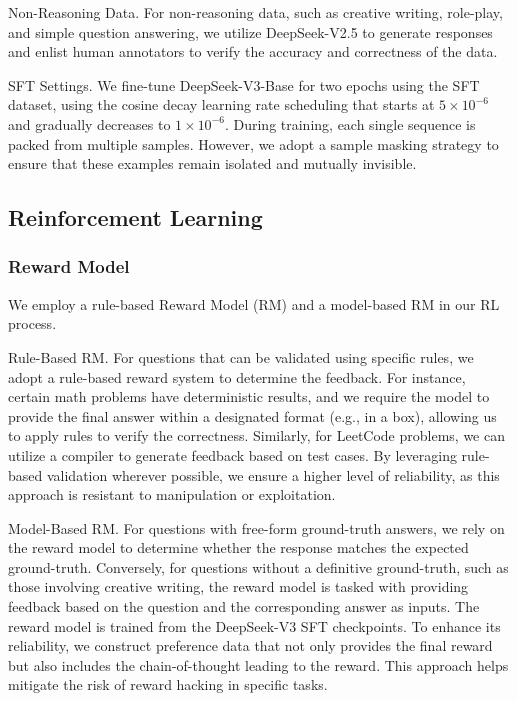 \documentclass[11pt,a4paper]{article}
\begin{document}
Non-Reasoning Data. 
For non-reasoning data, such as creative writing, role-play, and simple question answering, we utilize DeepSeek-V2.5 to generate responses and enlist human annotators to verify the accuracy and correctness of the data.

SFT Settings. 
We fine-tune DeepSeek-V3-Base for two epochs using the SFT dataset, using the cosine decay learning rate scheduling that starts at $5 \times 10^{-6}$ and gradually decreases to $1 \times 10^{-6}$. 
During training, each single sequence is packed from multiple samples. 
However, we adopt a sample masking strategy to ensure that these examples remain isolated and mutually invisible.

\subsection{Reinforcement Learning}

\subsubsection{Reward Model}

We employ a rule-based Reward Model (RM) and a model-based RM in our RL process.

Rule-Based RM. 
For questions that can be validated using specific rules, we adopt a rule-based reward system to determine the feedback. 
For instance, certain math problems have deterministic results, and we require the model to provide the final answer within a designated format (e.g., in a box), allowing us to apply rules to verify the correctness. 
Similarly, for LeetCode problems, we can utilize a compiler to generate feedback based on test cases. 
By leveraging rule-based validation wherever possible, we ensure a higher level of reliability, as this approach is resistant to manipulation or exploitation.

Model-Based RM. 
For questions with free-form ground-truth answers, we rely on the reward model to determine whether the response matches the expected ground-truth. 
Conversely, for questions without a definitive ground-truth, such as those involving creative writing, the reward model is tasked with providing feedback based on the question and the corresponding answer as inputs. 
The reward model is trained from the DeepSeek-V3 SFT checkpoints. 
To enhance its reliability, we construct preference data that not only provides the final reward but also includes the chain-of-thought leading to the reward. 
This approach helps mitigate the risk of reward hacking in specific tasks.
\end{document}
